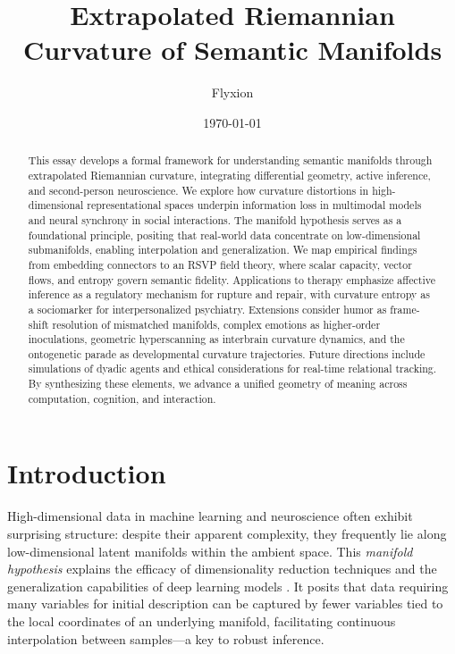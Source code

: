 \documentclass{article}
\title{Extrapolated Riemannian Curvature of Semantic Manifolds}
\author{Flyxion}
\date{\today}
\theoremstyle{definition}
\begin{document}
\maketitle

\begin{abstract}

This essay develops a formal framework for understanding semantic manifolds through extrapolated Riemannian curvature, integrating differential geometry, active inference, and second-person neuroscience. We explore how curvature distortions in high-dimensional representational spaces underpin information loss in multimodal models and neural synchrony in social interactions. The manifold hypothesis serves as a foundational principle, positing that real-world data concentrate on low-dimensional submanifolds, enabling interpolation and generalization. We map empirical findings from embedding connectors to an RSVP field theory, where scalar capacity, vector flows, and entropy govern semantic fidelity. Applications to therapy emphasize affective inference as a regulatory mechanism for rupture and repair, with curvature entropy as a sociomarker for interpersonalized psychiatry. Extensions consider humor as frame-shift resolution of mismatched manifolds, complex emotions as higher-order inoculations, geometric hyperscanning as interbrain curvature dynamics, and the ontogenetic parade as developmental curvature trajectories. Future directions include simulations of dyadic agents and ethical considerations for real-time relational tracking. By synthesizing these elements, we advance a unified geometry of meaning across computation, cognition, and interaction.
\end{abstract}

\tableofcontents

\section{Introduction}

High-dimensional data in machine learning and neuroscience often exhibit surprising structure: despite their apparent complexity, they frequently lie along low-dimensional latent manifolds within the ambient space. This \emph{manifold hypothesis} \cite{fefferman2016testing,gorban2018blessing,olah2014blog,cayton2005algorithms} explains the efficacy of dimensionality reduction techniques and the generalization capabilities of deep learning models \cite{chollet2021deep}. It posits that data requiring many variables for initial description can be captured by fewer variables tied to the local coordinates of an underlying manifold, facilitating continuous interpolation between samples—a key to robust inference.
\end{document}
